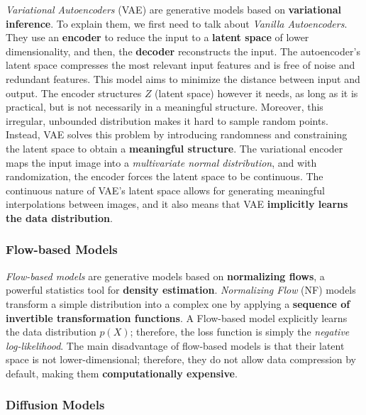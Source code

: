 \documentclass[preprint]{elsarticle}
\begin{document}
\emph{Variational Autoencoders} (VAE) \cite{kingma2022autoencoding} are generative models based on \textbf{variational inference}.
To explain them, we first need to talk about \emph{Vanilla Autoencoders}.
They use an \textbf{encoder} to reduce the input to a \textbf{latent space} of lower dimensionality, and then, the \textbf{decoder} reconstructs the input. 
The autoencoder's latent space compresses the most relevant input features and is free of noise and redundant features.
This model aims to minimize the distance between input and output. The encoder structures $Z$ (latent space) however it needs, as long as it is practical, but is not necessarily in a meaningful structure. 
Moreover, this irregular, unbounded distribution makes it hard to sample random points.
Instead, VAE solves this problem by introducing randomness and constraining the latent space to obtain a \textbf{meaningful structure}. 
The variational encoder maps the input image into a \emph{multivariate normal distribution}, and with randomization, the encoder forces the latent space to be continuous. 
The continuous nature of VAE's latent space allows for generating meaningful interpolations between images, and it also means that VAE \textbf{implicitly learns the data distribution}.

\subsubsection{Flow-based Models} \label{sec:flow}



\emph{Flow-based models} \cite{weng2018flow} are generative models based on \textbf{normalizing flows}, a powerful statistics tool for \textbf{density estimation}.
\emph{Normalizing Flow} (NF) \cite{rezende2016variational} models transform a simple distribution into a complex one by applying a \textbf{sequence of invertible transformation functions}. 
A Flow-based model explicitly learns the data distribution $p(X)$; therefore, the loss function is simply the \emph{negative log-likelihood}.
The main disadvantage of flow-based models is that their latent space is not lower-dimensional; 
therefore, they do not allow data compression by default, making them \textbf{computationally expensive}.


\subsubsection{Diffusion Models} \label{sec:diff}
\end{document}
